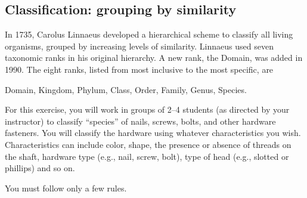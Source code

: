 \documentclass[12pt]{exam}
\newlength{\myindent}
\newcommand{\ind}{\hspace*{\myindent}}
\begin{document}
\subsection*{Classification: grouping by similarity }

In 1735, Carolus Linnaeus developed a hierarchical scheme to classify 
all living organisms, grouped by increasing levels of similarity. Linnaeus 
used seven taxonomic ranks in his original hierarchy. A new rank, the Domain, 
was added in 1990.  The eight ranks, listed from most inclusive to the most 
specific, are

\ind Domain, Kingdom, Phylum, Class, Order, Family, Genus, Species.

For this exercise, you will work in groups of 2–4 students (as directed by 
your instructor) to classify “species” of nails, screws, bolts, and other 
hardware fasteners. You will classify the hardware using whatever characteristics 
you wish. Characteristics can include color, shape, the presence or absence 
of threads on the shaft, hardware type (e.g., nail, screw, bolt), type 
of head (e.g., slotted or phillips) and so on. 

You must follow only a few rules.
\end{document}
